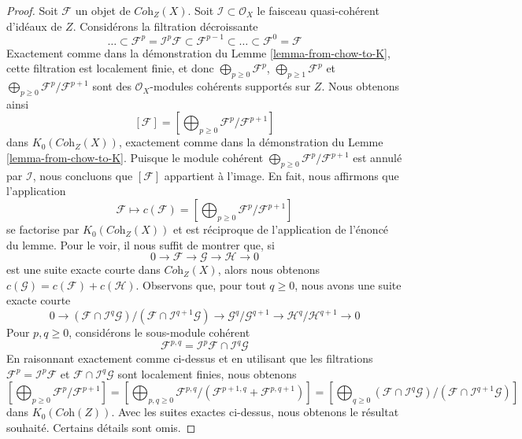 \begin{proof}
Soit $\mathcal{F}$ un objet de $\textit{Coh}_Z(X)$.
Soit $\mathcal{I} \subset \mathcal{O}_X$ le faisceau quasi-cohérent
d'idéaux de $Z$. Considérons la filtration décroissante
$$
\ldots \subset
\mathcal{F}^p = \mathcal{I}^p \mathcal{F} \subset
\mathcal{F}^{p - 1} \subset \ldots \subset \mathcal{F}^0 = \mathcal{F}
$$
Exactement comme dans la démonstration du Lemme \ref{lemma-from-chow-to-K}, cette filtration
est localement finie, et donc
$\bigoplus_{p \geq 0} \mathcal{F}^p$,
$\bigoplus_{p \geq 1} \mathcal{F}^p$ et
$\bigoplus_{p \geq 0} \mathcal{F}^p/\mathcal{F}^{p + 1}$
sont des $\mathcal{O}_X$-modules cohérents supportés sur $Z$.
Nous obtenons ainsi
$$
[\mathcal{F}] =
[\bigoplus\nolimits_{p \geq 0} \mathcal{F}^p/\mathcal{F}^{p + 1}]
$$
dans $K_0(\textit{Coh}_Z(X))$, exactement comme dans la démonstration du
Lemme \ref{lemma-from-chow-to-K}. Puisque le module cohérent
$\bigoplus_{p \geq 0} \mathcal{F}^p/\mathcal{F}^{p + 1}$
est annulé par $\mathcal{I}$, nous concluons que
$[\mathcal{F}]$ appartient à l'image. En fait, nous affirmons que l'application
$$
\mathcal{F} \longmapsto 
c(\mathcal{F}) =
[\bigoplus\nolimits_{p \geq 0} \mathcal{F}^p/\mathcal{F}^{p + 1}]
$$
se factorise par $K_0(\textit{Coh}_Z(X))$ et est réciproque de
l'application de l'énoncé du lemme. Pour le voir, il nous
suffit de montrer que, si
$$
0 \to \mathcal{F} \to \mathcal{G} \to \mathcal{H} \to 0
$$
est une suite exacte courte dans $\textit{Coh}_Z(X)$, alors nous
obtenons $c(\mathcal{G}) = c(\mathcal{F}) + c(\mathcal{H})$.
Observons que, pour tout $q \geq 0$, nous avons une suite exacte courte
$$
0 \to
(\mathcal{F} \cap \mathcal{I}^q\mathcal{G})/
(\mathcal{F} \cap \mathcal{I}^{q + 1}\mathcal{G}) \to
\mathcal{G}^q/\mathcal{G}^{q + 1} \to
\mathcal{H}^q/\mathcal{H}^{q + 1} \to 0
$$
Pour $p, q \geq 0$, considérons le sous-module cohérent
$$
\mathcal{F}^{p, q} = \mathcal{I}^p\mathcal{F} \cap \mathcal{I}^q\mathcal{G}
$$
En raisonnant exactement comme ci-dessus et en utilisant que les filtrations
$\mathcal{F}^p = \mathcal{I}^p\mathcal{F}$ et
$\mathcal{F} \cap \mathcal{I}^q\mathcal{G}$ sont localement finies,
nous obtenons
$$
[\bigoplus\nolimits_{p \geq 0} \mathcal{F}^p/\mathcal{F}^{p + 1}] =
[\bigoplus\nolimits_{p, q \geq 0}
\mathcal{F}^{p, q}/(\mathcal{F}^{p + 1, q} + \mathcal{F}^{p, q + 1})] =
[\bigoplus\nolimits_{q \geq 0}
(\mathcal{F} \cap \mathcal{I}^q\mathcal{G})/
(\mathcal{F} \cap \mathcal{I}^{q + 1}\mathcal{G})]
$$
dans $K_0(\textit{Coh}(Z))$. Avec les suites exactes ci-dessus, nous obtenons
le résultat souhaité. Certains détails sont omis.
\end{proof}













